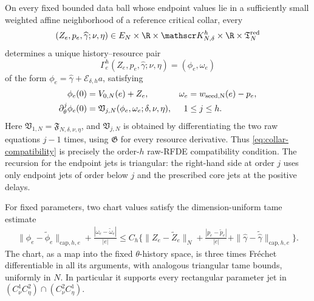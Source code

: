 \begin{proposition}
On every fixed bounded data ball whose endpoint values lie in a sufficiently
small weighted affine neighborhood of a reference critical collar, every
\begin{equation}
 (Z_e,p_e,\widehat\gamma;\nu,\eta)
 \in E_N\times\R\times\mathscr K_{N,\delta}^h
       \times\R\times\mathfrak T_N^{\rm red}       \label{eq:collar-chart-data}
\end{equation}
determines a unique history--resource pair
\begin{equation}
 \Gamma_e^h(Z_e,p_e,\widehat\gamma;\nu,\eta)
   =(\phi_e,\omega_e)                               \label{eq:collar-chart}
\end{equation}
of the form \(\phi_e=\widehat\gamma+\mathcal E_{\delta,h}a\), satisfying
\begin{align}
 \phi_e(0)&=V_{0,N}(e)+Z_e,&
 \omega_e&=w_{\rm seed,N}(e)-p_e,                 \label{eq:collar-current-data}\\
 \partial_\theta^j\phi_e(0)
 &=\mathfrak V_{j,N}(\phi_e,\omega_e;\delta,\nu,\eta),
 &1&\le j\le h.                                   \label{eq:collar-compatibility}
\end{align}
Here \(\mathfrak V_{1,N}=\mathfrak F_{N,\delta,\nu,\eta}\), and
\(\mathfrak V_{j,N}\) is obtained by differentiating the two raw equations
\(j-1\) times, using \(\mathfrak G\) for every resource derivative.
Thus \cref{eq:collar-compatibility} is precisely the order-\(h\) raw-RFDE
compatibility condition.  The recursion for the endpoint jets is triangular:
the right-hand side at order \(j\) uses only endpoint jets of order below
\(j\) and the prescribed core jets at the positive delays.

For fixed parameters, two chart values satisfy the dimension-uniform tame
estimate
\begin{align}
 \|\phi_e-\widetilde\phi_e\|_{\mathrm{cap},h,e}
 +\frac{|\omega_e-\widetilde\omega_e|}{|e|}
 \le C_h\biggl\{
  \|Z_e-\widetilde Z_e\|_N
  +\frac{|p_e-\widetilde p_e|}{|e|}
  +\|\widehat\gamma-\widetilde{\widehat\gamma}\|_{
        \mathrm{cap},h,e}\biggr\}.                \label{eq:collar-chart-tame-bound}
\end{align}
The chart, as a map into the fixed \(\theta\)-history space, is three times
Fr\'{e}chet differentiable in all its arguments, with analogous triangular
tame bounds, uniformly in \(N\).  In particular it supports every
rectangular parameter jet in
\((C_\nu^1C_\eta^2)\cap(C_\nu^2C_\eta^1)\).


\end{proposition}
